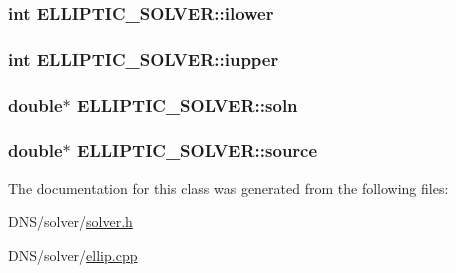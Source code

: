 \subsubsection[{\texorpdfstring{ilower}{ilower}}]{\setlength{\rightskip}{0pt plus 5cm}int E\+L\+L\+I\+P\+T\+I\+C\+\_\+\+S\+O\+L\+V\+E\+R\+::ilower}\hypertarget{class_e_l_l_i_p_t_i_c___s_o_l_v_e_r_a5cac5e978dffb7dc2259d424b020fb1c}{}\label{class_e_l_l_i_p_t_i_c___s_o_l_v_e_r_a5cac5e978dffb7dc2259d424b020fb1c}
\subsubsection[{\texorpdfstring{iupper}{iupper}}]{\setlength{\rightskip}{0pt plus 5cm}int E\+L\+L\+I\+P\+T\+I\+C\+\_\+\+S\+O\+L\+V\+E\+R\+::iupper}\hypertarget{class_e_l_l_i_p_t_i_c___s_o_l_v_e_r_ab0d937cefba4676295541d8d2c87d1f0}{}\label{class_e_l_l_i_p_t_i_c___s_o_l_v_e_r_ab0d937cefba4676295541d8d2c87d1f0}
\subsubsection[{\texorpdfstring{soln}{soln}}]{\setlength{\rightskip}{0pt plus 5cm}double$\ast$ E\+L\+L\+I\+P\+T\+I\+C\+\_\+\+S\+O\+L\+V\+E\+R\+::soln}\hypertarget{class_e_l_l_i_p_t_i_c___s_o_l_v_e_r_afd88e462b1adb1a09c1a155509d3a4bc}{}\label{class_e_l_l_i_p_t_i_c___s_o_l_v_e_r_afd88e462b1adb1a09c1a155509d3a4bc}
\subsubsection[{\texorpdfstring{source}{source}}]{\setlength{\rightskip}{0pt plus 5cm}double$\ast$ E\+L\+L\+I\+P\+T\+I\+C\+\_\+\+S\+O\+L\+V\+E\+R\+::source}\hypertarget{class_e_l_l_i_p_t_i_c___s_o_l_v_e_r_a4d424e8f413c716f4560811d14e40f59}{}\label{class_e_l_l_i_p_t_i_c___s_o_l_v_e_r_a4d424e8f413c716f4560811d14e40f59}


The documentation for this class was generated from the following files\+:\begin{DoxyCompactItemize}
\item 
D\+N\+S/solver/\hyperlink{solver_8h}{solver.\+h}\item 
D\+N\+S/solver/\hyperlink{ellip_8cpp}{ellip.\+cpp}\end{DoxyCompactItemize}
